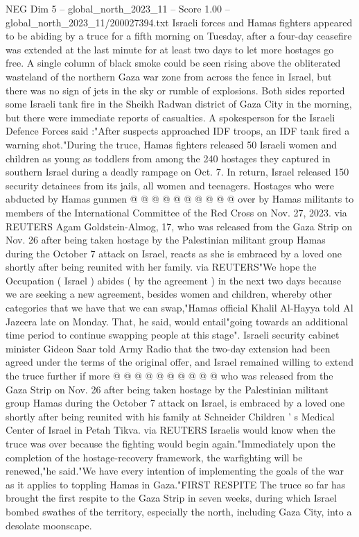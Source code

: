 \begin{textsample}{NEG Dim 5 – global\_north\_2023\_11 – Score 1.00 – global\_north\_2023\_11/200027394.txt}  \label{ex:f5_neg_038}
Israeli forces and Hamas fighters appeared to be abiding by a truce for a fifth morning on Tuesday, after a four-day ceasefire was extended at the last minute for at least two days to let more hostages go free.
A single column of black smoke could be seen rising above the obliterated wasteland of the northern Gaza war zone from across the fence in Israel, but there was no sign of jets in the sky or rumble of explosions.
Both sides reported some Israeli tank fire in the Sheikh Radwan district of Gaza City in the morning, but there were immediate reports of casualties.
A spokesperson for the Israeli Defence Forces said :"After suspects approached IDF troops, an IDF tank fired a warning shot."During the truce, Hamas fighters released 50 Israeli women and children as young as toddlers from among the 240 hostages they captured in southern Israel during a deadly rampage on Oct. 7.
In return, Israel released 150 security detainees from its jails, all women and teenagers.
Hostages who were abducted by Hamas gunmen @ @ @ @ @ @ @ @ @ @ over by Hamas militants to members of the International Committee of the Red Cross on Nov. 27, 2023. via REUTERS Agam Goldstein-Almog, 17, who was released from the Gaza Strip on Nov. 26 after being taken hostage by the Palestinian militant group Hamas during the October 7 attack on Israel, reacts as she is embraced by a loved one shortly after being reunited with her family. via REUTERS"We hope the Occupation ( Israel ) abides ( by the agreement ) in the next two days because we are seeking a new agreement, besides women and children, whereby other categories that we have that we can swap,"Hamas official Khalil Al-Hayya told Al Jazeera late on Monday.
That, he said, would entail"going towards an additional time period to continue swapping people at this stage".
Israeli security cabinet minister Gideon Saar told Army Radio that the two-day extension had been agreed under the terms of the original offer, and Israel remained willing to extend the truce further if more @ @ @ @ @ @ @ @ @ @ who was released from the Gaza Strip on Nov. 26 after being taken hostage by the Palestinian militant group Hamas during the October 7 attack on Israel, is embraced by a loved one shortly after being reunited with his family at Schneider Children ' s Medical Center of Israel in Petah Tikva. via REUTERS Israelis would know when the truce was over because the fighting would begin again."Immediately upon the completion of the hostage-recovery framework, the warfighting will be renewed,"he said."We have every intention of implementing the goals of the war as it applies to toppling Hamas in Gaza."FIRST RESPITE The truce so far has brought the first respite to the Gaza Strip in seven weeks, during which Israel bombed swathes of the territory, especially the north, including Gaza City, into a desolate moonscape.

\end{textsample}
